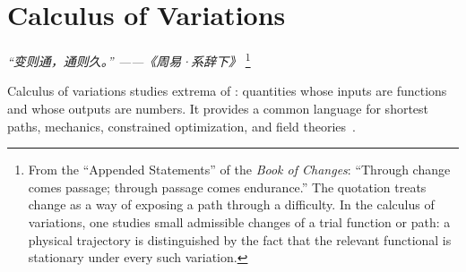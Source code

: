 \chapter{Calculus of Variations}
\renewcommand{\currentchapterpath}{chapters/cov/}

\begin{flushright}
\textit{“变则通，通则久。” ——《周易·系辞下》}
\footnote{From the ``Appended Statements'' of the 
\textit{Book of Changes}: ``Through change comes passage; 
through passage comes endurance.'' The quotation treats change 
as a way of exposing a path through a difficulty. 
In the calculus of variations, one studies small admissible 
changes of a trial function or path: a physical trajectory is 
distinguished by the fact that the relevant functional is 
stationary under every such variation.}
\end{flushright}

Calculus of variations studies extrema of : quantities whose inputs are functions and whose outputs are numbers. It provides a common language for shortest paths, mechanics, constrained optimization, and field theories~\cite{gelfand,goldstein}.

